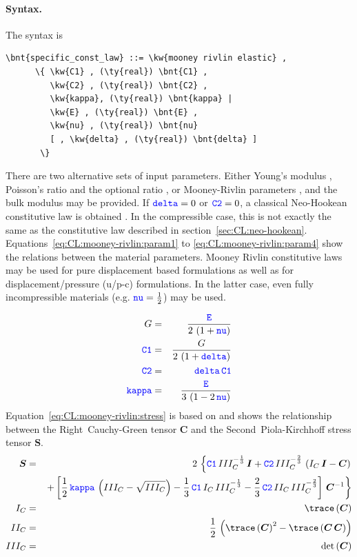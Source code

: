 \paragraph{Syntax.}
The syntax is
\begin{Verbatim}[commandchars=\\\{\}]
    \bnt{specific_const_law} ::= \kw{mooney rivlin elastic} ,
      \{ \kw{C1} , (\ty{real}) \bnt{C1} ,
         \kw{C2} , (\ty{real}) \bnt{C2} ,
         \kw{kappa}, (\ty{real}) \bnt{kappa} |
         \kw{E} , (\ty{real}) \bnt{E} ,
         \kw{nu} , (\ty{real}) \bnt{nu}
         [ , \kw{delta} , (\ty{real}) \bnt{delta} ]
       \}
\end{Verbatim}
There are two alternative sets of input parameters.
Either Young's modulus , Poisson's ratio  and the optional ratio ,
or Mooney-Rivlin parameters ,  and the bulk modulus  may be provided.
If $\textcolor{blue}{\texttt{delta}}=0$ or $\textcolor{blue}{\texttt{C2}}=0$, a classical Neo-Hookean constitutive law is obtained \cite{BATHE2016}.
In the compressible case, this is not exactly the same as the constitutive law described
in section~\ref{sec:CL:neo-hookean}.
Equations~\ref{eq:CL:mooney-rivlin:param1} to \ref{eq:CL:mooney-rivlin:param4} show the relations between the material parameters.
Mooney Rivlin constitutive laws may be used for pure displacement based formulations
as well as for displacement/pressure (u/p-c) formulations.
In the latter case, even fully incompressible materials (e.g. $\textcolor{blue}{\texttt{nu}} = \frac{1}{2}$) may be used.

\begin{eqnarray}
  G & = & \frac{\textcolor{blue}{\texttt{E}}}{2\,\left(1 + \textcolor{blue}{\texttt{nu}}\right)} \label{eq:CL:mooney-rivlin:param1} \\
  \textcolor{blue}{\texttt{C1}} & = & \frac{G}{2\,\left(1 + \textcolor{blue}{\texttt{delta}}\right)} \\
  \textcolor{blue}{\texttt{C2}} & = & \textcolor{blue}{\texttt{delta}}\,\textcolor{blue}{\texttt{C1}} \\
  \textcolor{blue}{\texttt{kappa}} & = & \frac{\textcolor{blue}{\texttt{E}}}{3\,\left(1 - 2\,\textcolor{blue}{\texttt{nu}}\right)}
  \label{eq:CL:mooney-rivlin:param4}
\end{eqnarray}
Equation~\ref{eq:CL:mooney-rivlin:stress} is based on \cite{BATHE2016} and shows the relationship
between the Right~Cauchy-Green tensor $\boldsymbol{C}$ and the Second~Piola-Kirchhoff stress tensor $\boldsymbol{S}$.
\begin{eqnarray}
  \boldsymbol{S} & = & 2\,\left\{ \nt{C1} \, III_C^{-\frac{1}{3}} \, \boldsymbol{I} + \nt{C2} \, III_C^{-\frac{2}{3}} \, \left(I_C \, \boldsymbol{I} - \boldsymbol{C} \right)\right. \nonumber \\
  & &  \left.+\left[ \frac{1}{2} \, \nt{kappa} \,\left(III_C - \sqrt{III_C}\right) - \frac{1}{3} \, \nt{C1} \, I_C \, III_C^{-\frac{1}{3}} - \frac{2}{3} \, \nt{C2} \, II_C \, III_C^{-\frac{2}{3}} \right]\, \boldsymbol{C}^{-1}\right\}
    \label{eq:CL:mooney-rivlin:stress} \\
  I_C & = & \trace\left(\boldsymbol{C}\right) \\
  II_C & = & \frac{1}{2} \,\left(\trace\left(\boldsymbol{C}\right)^2 - \trace\left(\boldsymbol{C} \, \boldsymbol{C}\right)\right) \\
  III_C & = & \det\left(\boldsymbol{C}\right)
\end{eqnarray}

